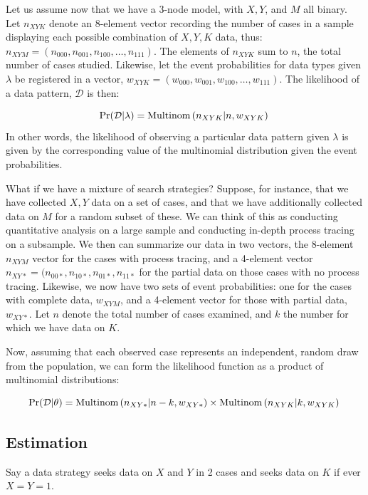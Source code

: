 \documentclass[
  12pt,
]{book}
\begin{document}
Let us assume now that we have a 3-node model, with \(X, Y\), and \(M\) all binary. Let \(n_{XYK}\) denote an 8-element vector recording the number of cases in a sample displaying each possible combination of \(X,Y,K\) data, thus: \(n_{XYM}=(n_{000},n_{001},n_{100},\dots ,n_{111})\). The elements of \(n_{XYK}\) sum to \(n\), the total number of cases studied. Likewise, let the event probabilities for data types given \(\lambda\) be registered in a vector, \(w_{XYK}=(w_{000},w_{001},w_{100},\dots ,w_{111})\). The likelihood of a data pattern, \(\mathcal D\) is then:

\[
\Pr(\mathcal{D}|\lambda) = 
  \text{Multinom}\left(n_{XYK}|n, w_{XYK}\right)  \\
\]
In other words, the likelihood of observing a particular data pattern given \(\lambda\) is given by the corresponding value of the multinomial distribution given the event probabilities.

What if we have a mixture of search strategies? Suppose, for instance, that we have collected \(X,Y\) data on a set of cases, and that we have additionally collected data on \(M\) for a random subset of these. We can think of this as conducting quantitative analysis on a large sample and conducting in-depth process tracing on a subsample. We then can summarize our data in two vectors, the 8-element \(n_{XYM}\) vector for the cases with process tracing, and a 4-element vector \(n_{XY*} = (n_{00*},n_{10*},n_{01*},n_{11*}\) for the partial data on those cases with no process tracing. Likewise, we now have two sets of event probabilities: one for the cases with complete data, \(w_{XYM}\), and a 4-element vector for those with partial data, \(w_{XY*}\). Let \(n\) denote the total number of cases examined, and \(k\) the number for which we have data on \(K\).

Now, assuming that each observed case represents an independent, random draw from the population, we can form the likelihood function as a product of multinomial distributions:

\[
\Pr(\mathcal{D}|\theta) = 
  \text{Multinom}\left(n_{XY*}|n-k, w_{XY*}\right) \times \text{Multinom}\left(n_{XYK}|k, w_{XYK}\right)  \\
\]

\hypertarget{estimation}{%
\subsection{Estimation}\label{estimation}}

Say a data strategy seeks data on \(X\) and \(Y\) in 2 cases and seeks data on \(K\) if ever \(X=Y=1\).
\end{document}
